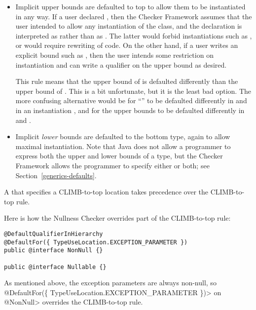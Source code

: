 \begin{itemize}
\item
Implicit upper bounds are defaulted to top to allow them to be instantiated
in any way.  If a user declared , then
the Checker Framework assumes that the user intended to allow any instantiation of the class,
and the declaration is interpreted as  rather than as .  The latter would forbid
instantiations such as , or would require
rewriting of code.  On the other hand, if a user writes an explicit bound
such as , then the user
intends some restriction on instantiation and can write a qualifier on the
upper bound as desired.

This rule means that the upper bound of  is defaulted
differently than the upper bound of .
This is a bit unfortunate, but it is the least bad option.  The
more confusing alternative would be for ``'' to be defaulted
differently in  and in an
instantiation , and for the upper bounds to be defaulted
differently in 
and .

\item
Implicit \emph{lower} bounds are defaulted to the bottom type, again to allow
maximal instantiation.  Note that Java does not allow a programmer to
express both the upper and lower bounds of a type, but the Checker
Framework allows the programmer to specify either or both;
see Section~\ref{generics-defaults}.

\end{itemize}

A  that specifies a
CLIMB-to-top location takes precedence over the CLIMB-to-top rule.

Here is how the Nullness Checker overrides part of the CLIMB-to-top rule:

\begin{Verbatim}
@DefaultQualifierInHierarchy
@DefaultFor({ TypeUseLocation.EXCEPTION_PARAMETER })
public @interface NonNull {}

public @interface Nullable {}
\end{Verbatim}

\noindent
 As mentioned above, the exception parameters are always non-null, so
\<@DefaultFor(\{ TypeUseLocation.EXCEPTION\_PARAMETER \})> on \<@NonNull> overrides
the CLIMB-to-top rule.


